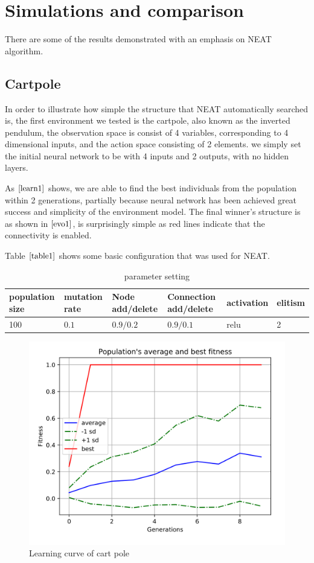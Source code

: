 \documentclass{article}
\begin{document}
 
\section{Simulations and comparison}
There are some of the results demonstrated with an emphasis on NEAT algorithm.

\subsection{Cartpole}

In order to illustrate how simple the structure that NEAT automatically searched is, the first environment we tested is the cartpole, also known as the inverted pendulum, 
 the observation space is consist of 4 variables, corresponding to 4 dimensional inputs, and the action space consisting of 2 elements.
 we simply set the initial neural network to be with 4 inputs and 2 outputs, with no hidden layers. 
 
 As $\ref{learn1}$ shows, we are able 
 to find the best individuals from the population within 2 generations, partially because neural network has been achieved great success 
 and simplicity of the environment model. The final winner's structure is as shown in $\ref{evo1}$, is surprisingly simple as red lines indicate that
 the connectivity is enabled.

 Table $\ref{table1}$ shows some basic configuration that was used for NEAT.

 \begin{table}[htbp]
  \caption{parameter setting}
  \label{table1}
  \centering
  \begin{tabular}{llllll}
    \toprule
    \cmidrule(r){1-6}
   population size & mutation rate & Node add/delete    & Connection add/delete    & activation & elitism  \\
    \midrule
   100 & $0.1$ &  $0.9/0.2$  & $0.9/0.1$ & relu &  2    \\
        \bottomrule
  \end{tabular}
\end{table}

\begin{figure}[htbp]
  \centering
  \includegraphics[width = .6\textwidth]{fitness_cartpole}
  \caption{Learning curve of cart pole}
  \label{learn1}
 \end{figure}
\end{document}

